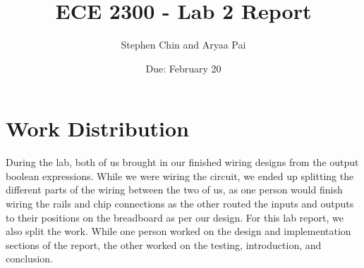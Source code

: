 \message{ !name(lab_2_report.tex)}\documentclass{article}
\title{ECE 2300 - Lab 2 Report}
\author{Stephen Chin and Aryaa Pai}
\date{Due: February 20}
\begin{document}
\section{Work Distribution}

During the lab, both of us brought in our finished wiring designs from
the output boolean expressions. While we were wiring the circuit, we
ended up splitting the different parts of the wiring between the two
of us, as one person would finish wiring the rails and chip
connections as the other routed the inputs and outputs to their
positions on the breadboard as per our design. For this lab report, we
also split the work. While one person worked on the design and
implementation sections of the report, the other worked on the
testing, introduction, and conclusion.



\end{document}
